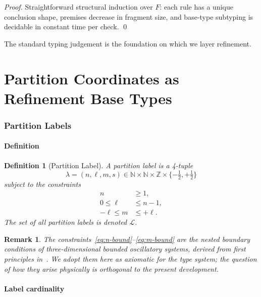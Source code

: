 \documentclass[twocolumn,11pt,a4paper]{article}
\newtheorem{definition}[theorem]{Definition}
\newtheorem{remark}[theorem]{Remark}
\newcommand{\Natural}{\mathbb{N}}
\newcommand{\Integer}{\mathbb{Z}}
\newcommand{\Lab}{\mathcal{L}}
\newcommand{\Frag}{F}
\begin{document}
\begin{proof}
Straightforward structural induction over $\Frag$: each rule has a unique conclusion shape, premises decrease in fragment size, and base-type subtyping is decidable in constant time per check. \qed
\end{proof}

The standard typing judgement is the foundation on which we layer refinement.

\part{Partition Coordinates as Refinement Base Types}

\section{Partition Labels}
\label{sec:partition-labels}

\subsection{Definition}

\begin{definition}[Partition Label]
\label{def:partition-label}
A \emph{partition label} is a 4-tuple
\[
\lambda = (n, \ell, m, s) \in \Natural \times \Natural \times \Integer \times \{-\tfrac{1}{2}, +\tfrac{1}{2}\}
\]
subject to the constraints
\begin{align}
n &\geq 1, \label{eq:n-bound}\\
0 \leq \ell &\leq n - 1, \label{eq:l-bound}\\
-\ell \leq m &\leq +\ell. \label{eq:m-bound}
\end{align}
The set of all partition labels is denoted $\Lab$.
\end{definition}

\begin{remark}
The constraints~\eqref{eq:n-bound}--\eqref{eq:m-bound} are the nested boundary conditions of three-dimensional bounded oscillatory systems, derived from first principles in~\citet{sachikonye2026bpst}. We adopt them here as axiomatic for the type system; the question of how they arise physically is orthogonal to the present development.
\end{remark}

\subsection{Label cardinality}
\end{document}
